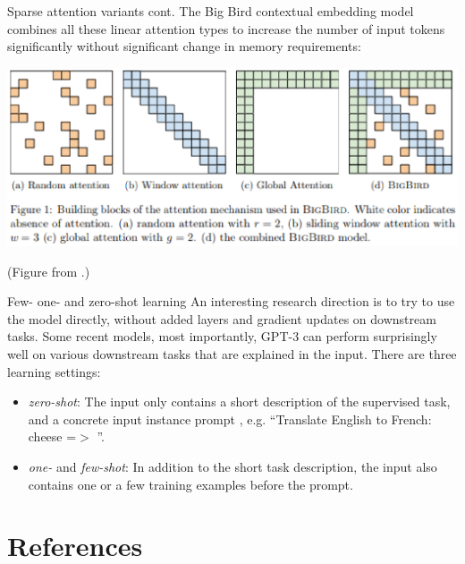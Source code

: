 \documentclass[style=upen, size=14pt]{powerdot}
\newcommand{\gold}{\color{arany}}
\theoremstyle{definition}
\begin{document}
\begin{slide}[toc=Sparse attention]{Sparse attention variants cont.}
  The Big Bird contextual embedding model \citep{zaheer2020big} combines all
  these linear attention types to increase the number of input tokens
  significantly without significant change in memory requirements:\medskip

  \begin{centering}
    
    \includegraphics[width=1.\textwidth]{figures/bigbird.eps}

    \footnotesize{(Figure from \cite{zaheer2020big}.)}
    
  \end{centering}
\end{slide}

\begin{slide}[toc=Few-shot learning]{Few- one- and zero-shot learning}
  An interesting research direction is to try to use the model directly, without
  added layers and gradient updates on downstream tasks. Some recent models,
  most importantly, GPT-3 \citep{brown2020language} can perform surprisingly
  well on various downstream tasks that are explained in the input. There are
  three learning settings:
  \begin{itemize}
  \item \emph{\gold zero-shot}: The input only contains a short description of
    the supervised task, and a concrete input instance prompt , e.g. ``Translate
    English to French: cheese =$>$ ''.
  \item \emph{\gold one-} and \emph{\gold few-shot}: In addition to the short
    task description, the input also contains one or a few training examples
    before the prompt.
  \end{itemize}
  
\end{slide}

\section {References}
\end{document}
